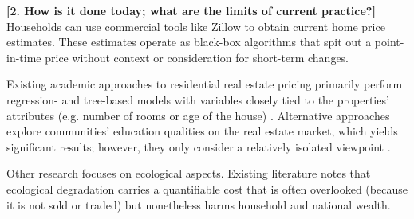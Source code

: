 \documentclass[sigconf,nonacm,11pt]{acmart}
\begin{document}
\textbf{[2. How is it done today; what are the limits of current practice?]}
Households can use commercial tools like Zillow to obtain current home price estimates. These estimates operate as black-box algorithms that spit out a point-in-time price without context or consideration for short-term changes.

Existing academic approaches to residential real estate pricing primarily perform regression- and tree-based models with variables closely tied to the properties' attributes (e.g. number of rooms or age of the house) \cite{Kim2003} \cite{Ceh2018} \cite{Manjuna2017}. Alternative approaches explore communities' education qualities on the real estate market, which yields significant results; however, they only consider a relatively isolated viewpoint \cite{Fleishman2017} \cite{Seo2009}.

Other research focuses on ecological aspects. Existing literature notes that ecological degradation carries a quantifiable cost that is often overlooked (because it is not sold or traded) but nonetheless harms household and national wealth.
\end{document}
